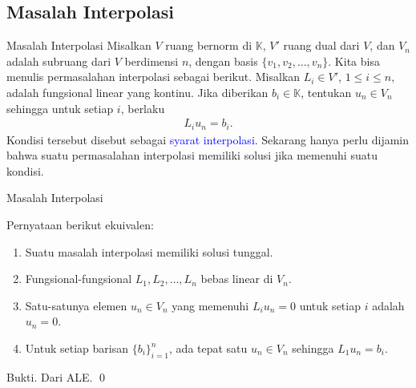 \documentclass[xcolor={dvipsnames}, 9pt]{beamer}
\renewcommand{\emph}[1]{\textcolor{Blue}{#1}}
\begin{document}
    \subsection{Masalah Interpolasi}
    \begin{frame}{Masalah Interpolasi}
        Misalkan $V$ ruang bernorm di $\mathbb{K}$, $V'$ ruang dual dari $V$, dan $V_n$ adalah subruang dari $V$ berdimensi $n$, dengan basis $\{v_1,v_2,\dots,v_n\}$. \newline
        Kita bisa menulis permasalahan interpolasi sebagai berikut. Misalkan $L_i\in V'$, $1\leq i\leq n$, adalah fungsional linear yang kontinu. Jika diberikan $b_i\in\mathbb{K}$, tentukan $u_n\in V_n$ sehingga untuk setiap $i$, berlaku
        \begin{align*}
            L_iu_n = b_i.
        \end{align*}
        Kondisi tersebut disebut sebagai \emph{syarat interpolasi}. Sekarang hanya perlu dijamin bahwa suatu permasalahan interpolasi memiliki solusi jika memenuhi suatu kondisi.
    \end{frame}
    \begin{frame}{Masalah Interpolasi}
        \begin{theorem}
            Pernyataan berikut ekuivalen:
            \begin{enumerate}
                \item Suatu masalah interpolasi memiliki solusi tunggal.
                \item Fungsional-fungsional $L_1,L_2,\dots,L_n$ bebas linear di $V_n$.
                \item Satu-satunya elemen $u_n\in V_n$ yang memenuhi $L_iu_n=0$ untuk setiap $i$ adalah $u_n=0$.
                \item Untuk setiap barisan $\{b_i\}_{i=1}^n$, ada tepat satu $u_n\in V_n$ sehingga $L_1u_n=b_i$.
            \end{enumerate}
        \end{theorem}
        Bukti. Dari ALE. \qed
    \end{frame}
\end{document}
